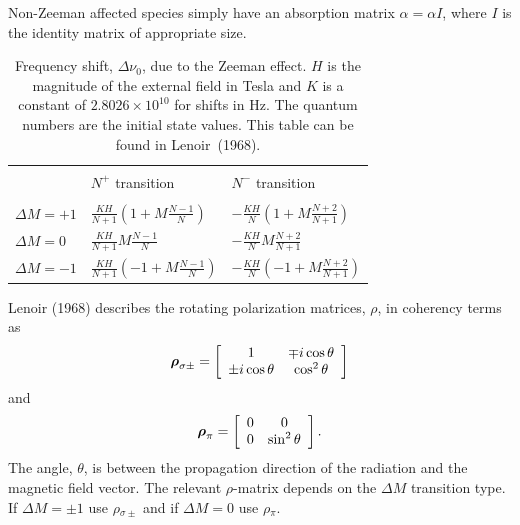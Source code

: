 Non-Zeeman affected species simply have an absorption matrix {\boldmath$\alpha$\unboldmath$=\alpha$\boldmath$I$\unboldmath}, where {\boldmath$I$} is the identity matrix of appropriate size.

\begin{table}[ht!]
 \centering
\begin{minipage}{280pt}
  \begin{tabular}{l|ll}
    \hline\\[-5pt]
    &$N^+$ transition&$N^-$ transition\\[5pt]\hline\\[-5pt]
    $\Delta M = +1$&$\frac{KH}{N+1}\left(1 +M\frac{N-1}{N}\right)$&$-\frac{KH}{N}\left(1 +M\frac{N+2}{N+1}\right)$\\[10pt]
    $\Delta M =  0$&$\frac{KH}{N+1}M\frac{N-1}{N}$&$-\frac{KH}{N}M\frac{N+2}{N+1}$\\[10pt]
    $\Delta M = -1$&$\frac{KH}{N+1}\left(-1 +M\frac{N-1}{N}\right)$&$-\frac{KH}{N}\left(-1 +M\frac{N+2}{N+1}\right)$
    \\[5pt]\hline
  \end{tabular}
\caption{Frequency shift, $\Delta\nu_0$, due to the Zeeman effect. $H$ is the magnitude of the external field in Tesla and $K$ is a constant of $2.8026\times10^{10}$
for shifts in Hz. The quantum numbers are the initial state values. This table can be found in Lenoir~(1968).}
\label{tab:delta_nu_0}
\end{minipage}
\end{table}

Lenoir (1968) describes the rotating polarization matrices, {\boldmath$\rho$}, in coherency terms as
\begin{equation}
 \mbox{\boldmath$\rho$\unboldmath}_{\sigma\pm} = \left[
\begin{array}{cc}
 1&\mp i\cos\theta\\
\pm i\cos\theta&\cos^2\theta
\end{array}
\right]\label{eq:rho_sigma}
\end{equation}
and
\begin{equation}
 \mbox{\boldmath$\rho$\unboldmath}_{\pi} = \left[
\begin{array}{cc}
 0&0\\
0&\sin^2\theta
\end{array}
\right].\label{eq:rho_pi}
\end{equation}
The angle, $\theta$, is between the propagation direction of the radiation and the magnetic field vector. The relevant {\boldmath$\rho$}-matrix  depends on the $\Delta M$ transition type. If $\Delta M = \pm 1$ use {\boldmath$\rho$}$_{\sigma\pm}$ and if $\Delta M = 0$ use {\boldmath$\rho$}$_{\pi}$.

